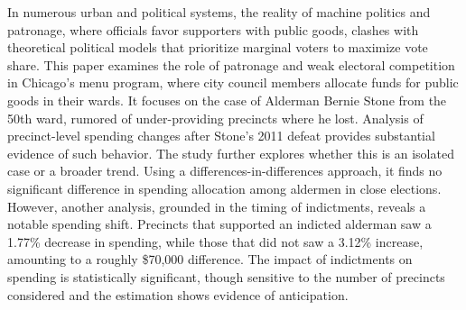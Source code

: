 \begin{spacing}{1.0}
    In numerous urban and political systems, the reality of machine politics and patronage, where officials favor supporters with public goods, clashes with theoretical political models that prioritize marginal voters to maximize vote share.
    This paper examines the role of patronage and weak electoral competition in Chicago's menu program, where city council members allocate funds for public goods in their wards.
    It focuses on the case of Alderman Bernie Stone from the 50th ward, rumored of under-providing precincts where he lost. Analysis of precinct-level spending changes after Stone's 2011 defeat provides substantial evidence of such behavior. 
    The study further explores whether this is an isolated case or a broader trend. 
    Using a differences-in-differences approach, it finds no significant difference in spending allocation among aldermen in close elections. 
    However, another analysis, grounded in the timing of indictments, reveals a notable spending shift. 
    Precincts that supported an indicted alderman saw a 1.77\% decrease in spending, while those that did not saw a 3.12\% increase, amounting to a roughly \$70,000 difference. 
    The impact of indictments on spending is statistically significant, though sensitive to the number of precincts considered and the estimation shows evidence of anticipation.
\end{spacing}